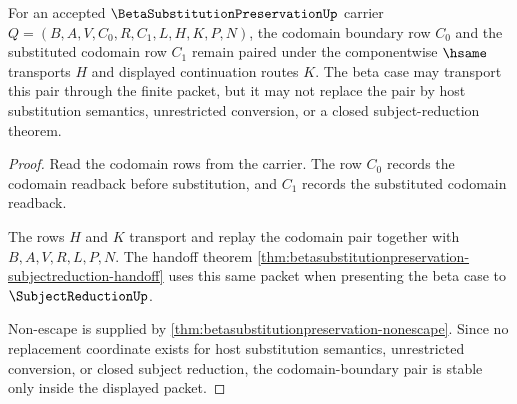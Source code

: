 \begin{theorem}
\label{thm:betasubstitutionpreservation-codomain-boundary-stability}
For an accepted $\BetaSubstitutionPreservationUp$ carrier $Q=(B,A,V,C_0,R,C_1,L,H,K,P,N)$, the codomain boundary row $C_0$ and the substituted codomain row $C_1$ remain paired under the componentwise $\hsame$ transports $H$ and displayed continuation routes $K$. The beta case may transport this pair through the finite packet, but it may not replace the pair by host substitution semantics, unrestricted conversion, or a closed subject-reduction theorem.
\end{theorem}
\begin{proof}
Read the codomain rows from the carrier. The row $C_0$ records the codomain readback before substitution, and $C_1$ records the substituted codomain readback.

The rows $H$ and $K$ transport and replay the codomain pair together with $B,A,V,R,L,P,N$. The handoff theorem \autoref{thm:betasubstitutionpreservation-subjectreduction-handoff} uses this same packet when presenting the beta case to $\SubjectReductionUp$.

Non-escape is supplied by \autoref{thm:betasubstitutionpreservation-nonescape}. Since no replacement coordinate exists for host substitution semantics, unrestricted conversion, or closed subject reduction, the codomain-boundary pair is stable only inside the displayed packet.
\end{proof}


